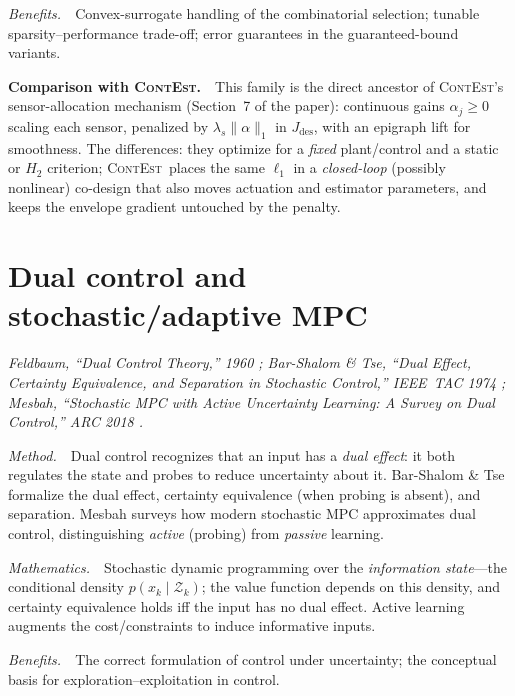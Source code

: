 \documentclass[11pt]{article}
\newcommand{\ContEst}{\textsc{ContEst}}
\newcommand{\Method}{\smallskip\noindent\textit{Method.}~}
\newcommand{\Maths}{\smallskip\noindent\textit{Mathematics.}~}
\newcommand{\Benefits}{\smallskip\noindent\textit{Benefits.}~}
\newcommand{\Versus}{\smallskip\noindent\textbf{Comparison with \ContEst.}~}
\begin{document}
\Benefits\ Convex-surrogate handling of the combinatorial selection; tunable
sparsity--performance trade-off; error guarantees in the guaranteed-bound variants.

\Versus\ This family is the direct ancestor of \ContEst's sensor-allocation
mechanism (Section~7 of the paper): continuous gains $\alpha_j\ge0$ scaling each
sensor, penalized by $\lambda_s\|\alpha\|_1$ in $J_{\mathrm{des}}$, with an epigraph
lift for smoothness. The differences: they optimize for a \emph{fixed} plant/control
and a static or $H_2$ criterion; \ContEst\ places the same $\ell_1$ in a
\emph{closed-loop} (possibly nonlinear) co-design that also moves actuation and
estimator parameters, and keeps the envelope gradient untouched by the penalty.

\section{Dual control and stochastic/adaptive MPC}\label{sec:dual}
\noindent\emph{Feldbaum, ``Dual Control Theory,'' 1960 \cite{feldbaum1960dual};
Bar-Shalom \& Tse, ``Dual Effect, Certainty Equivalence, and Separation in
Stochastic Control,'' IEEE~TAC 1974 \cite{bar1974dual}; Mesbah, ``Stochastic MPC
with Active Uncertainty Learning: A Survey on Dual Control,'' ARC 2018
\cite{mesbah2018stochastic}.}

\Method\ Dual control recognizes that an input has a \emph{dual effect}: it both
regulates the state and probes to reduce uncertainty about it. Bar-Shalom \& Tse
formalize the dual effect, certainty equivalence (when probing is absent), and
separation. Mesbah surveys how modern stochastic MPC approximates dual control,
distinguishing \emph{active} (probing) from \emph{passive} learning.

\Maths\ Stochastic dynamic programming over the \emph{information state}---the
conditional density $p(x_k\mid\mathcal Z_k)$; the value function depends on this
density, and certainty equivalence holds iff the input has no dual effect. Active
learning augments the cost/constraints to induce informative inputs.

\Benefits\ The correct formulation of control under uncertainty; the conceptual
basis for exploration--exploitation in control.
\end{document}
